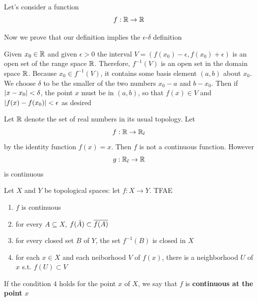 \documentclass[11pt]{article}
\begin{document}
\begin{examplle}[]
Let's consider a function
\begin{equation*}
f:\mathbb{R}\to\mathbb{R}
\end{equation*}

Now we prove that our definition implies the \(\epsilon\)-\(\delta\) definition

Given \(x_0\in\mathbb{R}\)  and given \(\epsilon>0\) the interval \(V=(f(x_0)-\epsilon,f(x_0)+\epsilon)\) is an open set of the
range space \(\mathbb{R}\). Therefore, \(f^{-1}(V)\) is an open set in the domain space \(\mathbb{R}\).
Because \(x_0\in f^{-1}(V)\), it contains some basis element \((a,b)\) about \(x_0\). We choose
\(\delta\) to be the smaller of the two numbers \(x_0-a\) and \(b-x_0\). Then if \(\abs{x-x_0}<\delta\), the
point \(x\) must be in \((a,b)\), so that \(f(x)\in V\) and \(\abs{f(x)-f(x_0)}<\epsilon\) as desired
\end{examplle}

\begin{examplle}[]
Let \(\mathbb{R}\) denote the set of real numbers in its usual topology. Let
\begin{equation*}
f:\mathbb{R}\to\mathbb{R}_l
\end{equation*}
by the identity function \(f(x)=x\). Then \(f\) is not a continuous function. However
\begin{equation*}
g:\mathbb{R}_l\to\mathbb{R}
\end{equation*}
is continuous
\end{examplle}

\begin{theorem}[]
Let \(X\) and \(Y\) be topological spaces: let \(f:X\to Y\). TFAE
\begin{enumerate}
\item \(f\) is continuous
\item for every \(A\subseteq X\), \(f(\bar{A})\subset\overline{f(A)}\)
\item for every closed set \(B\) of \(Y\), the set \(f^{-1}(B)\) is closed in \(X\)
\item for each \(x\in X\) and each neiborhood \(V\) of \(f(x)\), there is a neighborhood \(U\)
of \(x\) s.t. \(f(U)\subset V\)
\end{enumerate}


If the condition 4 holds for the point \(x\) of \(X\), we say that \(f\) is \textbf{continuous at the
point \(x\)}
\end{theorem}
\end{document}
